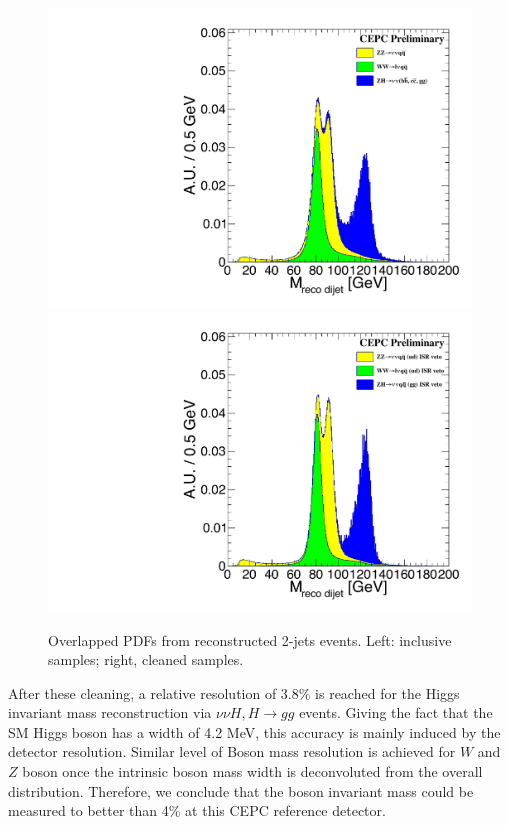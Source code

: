 \begin{figure}[h!]
\centering
\includegraphics[scale=0.30]{Figures/Performance/peizhu/HZW_mass_withoutGrid1.pdf}
\includegraphics[scale=0.30]{Figures/Performance/peizhu/HZW_mass_withoutGrid5.pdf}
\caption{Overlapped PDFs from reconstructed 2-jets events. Left: inclusive samples; right, cleaned samples. }
\label{fig:jet-three-peaks}
\end{figure}


After these cleaning, a relative resolution of 3.8\% is reached for the Higgs invariant mass reconstruction
via $\nu\nu H, H\to gg$ events.
Giving the fact that the SM Higgs boson has a width of 4.2 MeV, this accuracy is mainly induced by the detector resolution.
Similar level of Boson mass resolution is achieved for $W$ and $Z$ boson
once the intrinsic boson mass width is deconvoluted from the overall distribution.
Therefore, we conclude that the boson invariant mass could be measured to better than 4\% at this CEPC reference detector. 

